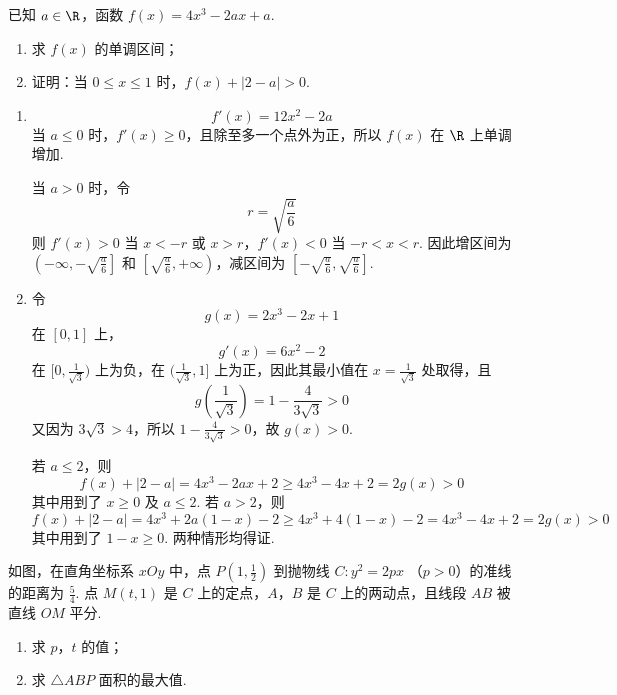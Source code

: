 \begin{problem}
已知 \(a \in \R\)，函数 \(f(x) = 4x^3 - 2ax + a\).

\begin{enumerate}
\item 求 \(f(x)\) 的单调区间；
\item 证明：当 \(0 \leqslant x \leqslant 1\) 时，\(f(x) + |2 - a| > 0\).
\end{enumerate}
\end{problem}

\begin{solution}
\begin{enumerate}
\item
\[
f'(x)=12x^2-2a
\]
当 \(a\leqslant0\) 时，\(f'(x)\geqslant0\)，且除至多一个点外为正，所以 \(f(x)\) 在 \(\R\) 上单调增加.

当 \(a>0\) 时，令
\[
r=\sqrt{\frac a6}
\]
则 \(f'(x)>0\) 当 \(x<-r\) 或 \(x>r\)，\(f'(x)<0\) 当 \(-r<x<r\). 因此增区间为 \(\left(-\infty,-\sqrt{\frac a6}\right]\) 和 \(\left[\sqrt{\frac a6},+\infty\right)\)，减区间为 \(\left[-\sqrt{\frac a6},\sqrt{\frac a6}\right]\).

\item 令
\[
g(x)=2x^3-2x+1
\]
在 \([0,1]\) 上，
\[
g'(x)=6x^2-2
\]
在 \([0,\frac{1}{\sqrt3})\) 上为负，在 \((\frac{1}{\sqrt3},1]\) 上为正，因此其最小值在 \(x=\frac{1}{\sqrt3}\) 处取得，且
\[
g\left(\frac1{\sqrt3}\right)
=1-\frac4{3\sqrt3}>0
\]
又因为 \(3\sqrt3>4\)，所以 \(1-\frac{4}{3\sqrt3}>0\)，故 \(g(x)>0\).

若 \(a\leqslant2\)，则
\[
f(x)+|2-a|=4x^3-2ax+2
\geqslant4x^3-4x+2=2g(x)>0
\]
其中用到了 \(x\geqslant0\) 及 \(a\leqslant2\). 若 \(a>2\)，则
\[
f(x)+|2-a|=4x^3+2a(1-x)-2
\geqslant4x^3+4(1-x)-2
=4x^3-4x+2=2g(x)>0
\]
其中用到了 \(1-x\geqslant0\). 两种情形均得证.
\end{enumerate}
\end{solution}

\begin{problem}
如图，在直角坐标系 \(xOy\) 中，点 \(P\left(1, \frac{1}{2}\right)\) 到抛物线 \(C: y^2 = 2px \) （\(p > 0\)）的准线的距离为 \(\frac{5}{4}\). 点 \(M(t, 1)\) 是 \(C\) 上的定点，\(A\)，\(B\) 是 \(C\) 上的两动点，且线段 \(AB\) 被直线 \(OM\) 平分.

\begin{enumerate}
\item 求 \(p\)，\(t\) 的值；
\item 求 \(\triangle ABP\) 面积的最大值.
\end{enumerate}

\end{problem}

